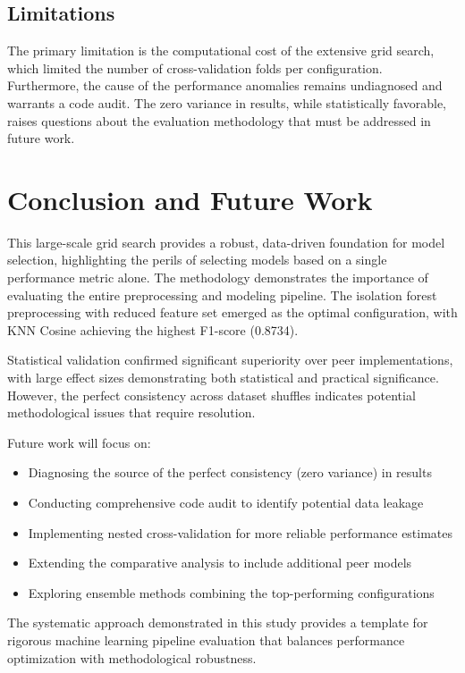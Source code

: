 \documentclass[11pt]{article}
\begin{document}
\subsection{Limitations}
The primary limitation is the computational cost of the extensive grid search, which limited the number of cross-validation folds per configuration. Furthermore, the cause of the performance anomalies remains undiagnosed and warrants a code audit. The zero variance in results, while statistically favorable, raises questions about the evaluation methodology that must be addressed in future work.

\section{Conclusion and Future Work}

This large-scale grid search provides a robust, data-driven foundation for model selection, highlighting the perils of selecting models based on a single performance metric alone. The methodology demonstrates the importance of evaluating the entire preprocessing and modeling pipeline. The isolation forest preprocessing with reduced feature set emerged as the optimal configuration, with KNN Cosine achieving the highest F1-score (0.8734).

Statistical validation confirmed significant superiority over peer implementations, with large effect sizes demonstrating both statistical and practical significance. However, the perfect consistency across dataset shuffles indicates potential methodological issues that require resolution.

Future work will focus on:
\begin{itemize}
\item Diagnosing the source of the perfect consistency (zero variance) in results
\item Conducting comprehensive code audit to identify potential data leakage
\item Implementing nested cross-validation for more reliable performance estimates
\item Extending the comparative analysis to include additional peer models
\item Exploring ensemble methods combining the top-performing configurations
\end{itemize}

The systematic approach demonstrated in this study provides a template for rigorous machine learning pipeline evaluation that balances performance optimization with methodological robustness.
\end{document}

